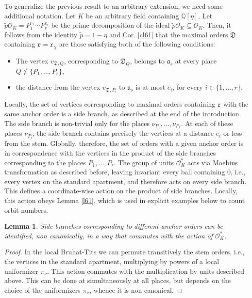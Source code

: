 \documentclass{article}
\newtheorem{Lem}[Prop]{Lemma}
\theoremstyle{definition}
\theoremstyle{remark}
\begin{document}
To generalize the previous result to an arbitrary extension,
we need some additional notation. Let $K$ be an arbitrary field containing
$\mathbb{Q}[\eta ]$. Let $\tilde{p}\mathcal{O}_K=
P_1^{e_1}\cdots P_r^{e_r}$ be the prime decomposition of
the ideal  $\tilde{p}\mathcal{O}_K\subseteq\mathcal{O}_K$. Then,
it follows from the identity $\tilde{p}=1-\eta $ and
Cor. \ref{cl61} that the maximal orders $\mathfrak{D}$ containing 
$\mathtt{r}=\mathtt{r}_\chi$ 
are those satisfying both of the following conditions:
\begin{itemize}
\item The vertex $v_{\mathfrak{D},Q}$, corresponding to $\mathfrak{D}_Q$, 
belongs to $\mathfrak{a}_s$ at every place $Q\notin\{P_1,\dots,P_r\}$,
\item the distance from the vertex $v_{\mathfrak{D},P_i}$ to
$\mathfrak{a}_s$ is at most $e_i$, for every $i\in\{1,\dots,r\}$.
\end{itemize}
Locally, the set of vertices corresponding to maximal orders containing $\mathtt{r}$ 
with the same anchor order is a side branch, as described at the
end of the introduction.
The side branch is non-trivial only for the places $\nu_{P_1},\dots,\nu_{P_r}$. At each of
these places $\nu_{P_i}$, the side 
branch contains precisely the vertices at a distance $e_i$ or less from
the stem. Globally, therefore,
the set of orders with a given anchor order is
in correspondence with the vertices in the product of the side
branches corresponding to the places $P_1,\dots,P_r$.
The group of units $\mathcal{O}_K^*$
acts via Moebius transformation as described before,
leaving invariant every ball containing $0$,
i.e., every vertex on the standard apartment, and
therefore acts on every side branch. This defines a
coordinate-wise action on the product of side branches. 
Locally, this action obeys Lemma
\ref{l61}, which is used in explicit examples below to
count orbit numbers. 

\begin{Lem}\label{lsd1}
    Side branches corresponding to different anchor orders can be 
    identified, non canonically, in a way that commutes with the
    action of $\mathcal{O}_K^*$.
\end{Lem}

\begin{proof}
In the local Bruhat-Tits we can permute
transitively the stem orders, i.e., the vertices in the standard 
apartment, multiplying by powers of
a local uniformizer $\pi_\nu$. This action commutes with the multiplication by units
described above. This can be done at simultaneously at all places, but  depends on the choice of the uniformizers $\pi_\nu$, whence it is non-canonical.
\end{proof}
\end{document}
